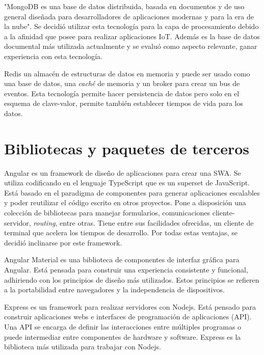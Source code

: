 "MongoDB es una base de datos distribuida, basada en documentos y de uso general diseñada para desarrolladores de aplicaciones modernas y para la era de la nube". \citep{WEBSITE:MongoHome}
Se decidió utilizar esta tecnología para la capa de procesamiento debido a la afinidad que posee para realizar aplicaciones IoT.
Además es la base de datos documental más utilizada actualmente \citep{WEBSITE:DBRanking} y se evaluó como aspecto relevante, ganar experiencia con esta tecnología.

Redis un almacén de estructuras de datos en memoria y puede ser usado como una base de datos, una \emph{caché} de memoria y un broker para crear un bus de eventos.
Esta tecnología permite hacer persistencia de datos pero solo en el esquema de clave-valor, permite también establecer tiempos de vida para los datos.
	
\section{Bibliotecas y paquetes de terceros}

Angular es un framework de diseño de aplicaciones para crear una SWA.
Se utiliza codificando en el lenguaje TypeScript que es un superset de JavaScript.
Está basado en el paradigma de componentes para generar aplicaciones escalables y poder reutilizar el código escrito en otros proyectos.
Pone a disposición una colección de bibliotecas para manejar formularios, comunicaciones cliente-servidor, \emph{routing}, entre otras.
Tiene entre sus facilidades ofrecidas, un cliente de terminal que acelera los tiempos de desarrollo.
Por todas estas ventajas, se decidió inclinarse por este framework.

Angular Material es una biblioteca de componentes de interfaz gráfica para Angular.
Está pensada para construir una experiencia consistente y funcional, adhiriendo con los principios de diseño más utilizados.
Estos principios se refieren a la portabilidad entre navegadores y la independencia de dispositivos.

Express es un framework para realizar servidores con Nodejs.
Está pensado para construir aplicaciones webs e interfaces de programación de aplicaciones (API).
Una API se encarga de definir las interacciones entre múltiples programas o puede intermediar entre componentes de hardware y software.
Express es la biblioteca más utilizada para trabajar con Nodejs. \citep{WEBSITE:Express}

